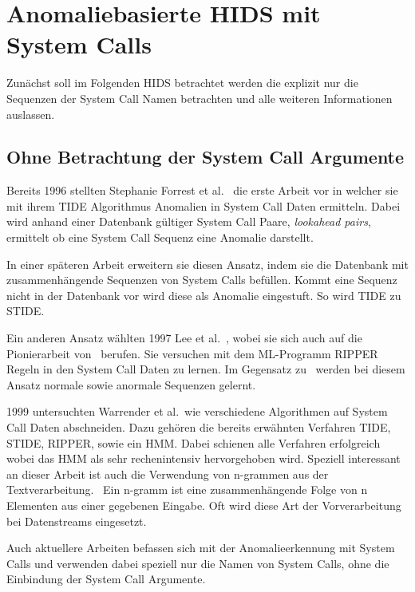 \section{Anomaliebasierte HIDS mit System Calls}

    Zunächst soll im Folgenden \ac{HIDS} betrachtet werden die explizit nur die Sequenzen der System Call Namen betrachten und alle weiteren Informationen auslassen.

    \subsection{Ohne Betrachtung der System Call Argumente}
        Bereits 1996 stellten Stephanie Forrest et al.~\cite{FORREST} die erste Arbeit vor in welcher sie mit ihrem \ac{TIDE} Algorithmus Anomalien in System Call Daten ermitteln.
        Dabei wird anhand einer Datenbank gültiger System Call Paare, \textit{lookahead pairs}, ermittelt ob eine System Call Sequenz eine Anomalie darstellt.

        In einer späteren Arbeit erweitern sie diesen Ansatz, indem sie die Datenbank mit zusammenhängende Sequenzen von System Calls befüllen.
        Kommt eine Sequenz nicht in der Datenbank vor wird diese als Anomalie eingestuft.
        So wird \ac{TIDE} zu \ac{STIDE}.~\cite{STIDE}

        Ein anderen Ansatz wählten 1997 Lee et al.~\cite{LEE1997}, wobei sie sich auch auf die Pionierarbeit von~\cite{FORREST} berufen.
        Sie versuchen mit dem \ac{ML}-Programm \ac{RIPPER} Regeln in den System Call Daten zu lernen.
        Im Gegensatz zu~\cite{FORREST} werden bei diesem Ansatz normale sowie anormale Sequenzen gelernt.

        1999 untersuchten Warrender et al.\ wie verschiedene Algorithmen auf System Call Daten abschneiden.
        Dazu gehören die bereits erwähnten Verfahren \ac{TIDE}, \ac{STIDE}, \ac{RIPPER}, sowie ein \ac{HMM}.
        Dabei schienen alle Verfahren erfolgreich wobei das \ac{HMM} als sehr rechenintensiv hervorgehoben wird.
        Speziell interessant an dieser Arbeit ist auch die Verwendung von n-grammen aus der Textverarbeitung.~\cite{STIDE_Alternatives}
        Ein n-gramm ist eine zusammenhängende Folge von n Elementen aus einer gegebenen Eingabe.
        Oft wird diese Art der Vorverarbeitung bei Datenstreams eingesetzt.
 
        Auch aktuellere Arbeiten befassen sich mit der Anomalieerkennung mit System Calls und verwenden dabei speziell nur die Namen von System Calls, ohne die Einbindung der System Call Argumente.
    
